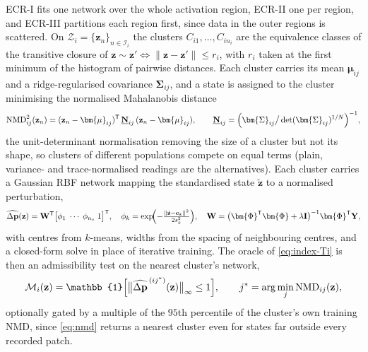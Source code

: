 ECR-I fits one network over the whole activation region, ECR-II one per region,
and ECR-III partitions each region first, since data in the outer regions is
scattered. On $\mathcal{Z}_i=\{\mathbf{z}_n\}_{n\in\mathcal{I}_i}$ the clusters
$C_{i1},\dots,C_{in_i}$ are the equivalence classes of the transitive closure
of $\mathbf{z}\sim\mathbf{z}'\iff\|\mathbf{z}-\mathbf{z}'\|\le r_i$, with $r_i$
taken at the first minimum of the histogram of pairwise distances. Each cluster
carries its mean $\bm{\mu}_{ij}$ and a ridge-regularised covariance
$\bm{\Sigma}_{ij}$, and a state is assigned to the cluster minimising the
normalised Mahalanobis distance
%
\begin{equation}
\mathrm{NMD}^{2}_{ij}(\mathbf{z}_n)=(\mathbf{z}_n-\bm{\mu}_{ij})^{\mathsf T}\,
\underline{\mathbf{N}}_{ij}\,(\mathbf{z}_n-\bm{\mu}_{ij}),
\qquad
\underline{\mathbf{N}}_{ij}=\Bigl(\bm{\Sigma}_{ij}\big/\det(\bm{\Sigma}_{ij})^{1/N}\Bigr)^{-1},
\label{eq:nmd}
\end{equation}
%
the unit-determinant normalisation removing the size of a cluster but not its
shape, so clusters of different populations compete on equal terms (plain,
variance- and trace-normalised readings are the alternatives). Each cluster
carries a Gaussian RBF network mapping the standardised state
$\tilde{\mathbf{z}}$ to a normalised perturbation,
%
\begin{equation}
\widehat{\Delta\mathbf{p}}(\mathbf{z})=\mathbf{W}^{\mathsf T}
\bigl[\phi_1\;\cdots\;\phi_{n_c}\;1\bigr]^{\mathsf T},
\quad
\phi_k=\exp\!\Bigl(-\tfrac{\|\tilde{\mathbf{z}}-\mathbf{c}_k\|^{2}}{2s_k^{2}}\Bigr),
\quad
\mathbf{W}=\bigl(\bm{\Phi}^{\mathsf T}\bm{\Phi}+\lambda\mathbf{I}\bigr)^{-1}\bm{\Phi}^{\mathsf T}\mathbf{Y},
\label{eq:rbf}
\end{equation}
%
with centres from $k$-means, widths from the spacing of neighbouring centres,
and a closed-form solve in place of iterative training. The oracle of
\eqref{eq:index-Ti} is then an admissibility test on the nearest cluster's
network,
%
\begin{equation}
\mathcal{M}_i(\mathbf{z})=\mathbb{1}\Bigl[\bigl\|\widehat{\Delta\mathbf{p}}^{\,(ij^{*})}(\mathbf{z})\bigr\|_{\infty}\le1\Bigr],
\qquad
j^{*}=\arg\min_j\mathrm{NMD}_{ij}(\mathbf{z}),
\label{eq:membership-oracle}
\end{equation}
%
optionally gated by a multiple of the $95$th percentile of the cluster's own
training NMD, since \eqref{eq:nmd} returns a nearest cluster even for states
far outside every recorded patch.

